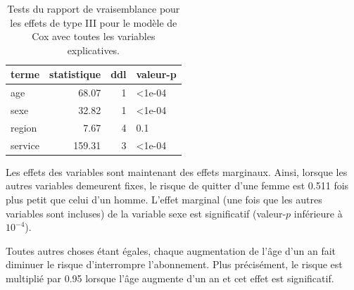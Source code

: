 \documentclass[
  11pt,
  letterpaper,
]{scrbook}
\theoremstyle{definition}
\theoremstyle{remark}
\begin{document}
\hypertarget{tbl-survie5-deviance}{}
\begin{table}
\caption{\label{tbl-survie5-deviance}Tests du rapport de vraisemblance pour les effets de type III pour le
modèle de Cox avec toutes les variables explicatives. }\tabularnewline

\centering
\begin{tabular}{lrrl}
\toprule
terme & statistique & ddl & valeur-p\\
\midrule
age & 68.07 & 1 & <1e-04\\
sexe & 32.82 & 1 & <1e-04\\
region & 7.67 & 4 & 0.1\\
service & 159.31 & 3 & <1e-04\\
\bottomrule
\end{tabular}
\end{table}

Les effets des variables sont maintenant des effets marginaux. Ainsi,
lorsque les autres variables demeurent fixes, le risque de quitter d'une
femme est 0.511 fois plus petit que celui d'un homme. L'effet marginal
(une fois que les autres variables sont incluses) de la variable sexe
est significatif (valeur-\(p\) inférieure à \(10^{-4}\)).

Toutes autres choses étant égales, chaque augmentation de l'âge d'un an
fait diminuer le risque d'interrompre l'abonnement. Plus précisément, le
risque est multiplié par 0.95 lorsque l'âge augmente d'un an et cet
effet est significatif.
\end{document}
